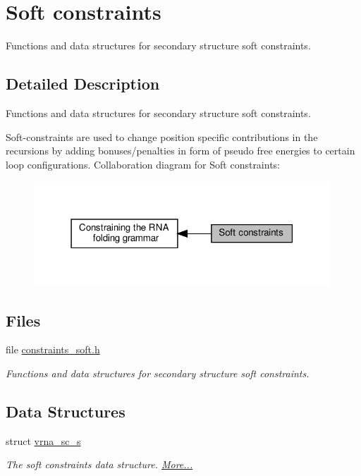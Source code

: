 \hypertarget{group__soft__constraints}{}\section{Soft constraints}
\label{group__soft__constraints}


Functions and data structures for secondary structure soft constraints.  




\subsection{Detailed Description}
Functions and data structures for secondary structure soft constraints. 

Soft-\/constraints are used to change position specific contributions in the recursions by adding bonuses/penalties in form of pseudo free energies to certain loop configurations. Collaboration diagram for Soft constraints\+:
\nopagebreak
\begin{figure}[H]
\begin{center}
\leavevmode
\includegraphics[width=315pt]{group__soft__constraints}
\end{center}
\end{figure}
\subsection*{Files}
\begin{DoxyCompactItemize}
\item 
file \hyperlink{constraints__soft_8h}{constraints\+\_\+soft.\+h}
\begin{DoxyCompactList}\small\item\em Functions and data structures for secondary structure soft constraints. \end{DoxyCompactList}\end{DoxyCompactItemize}
\subsection*{Data Structures}
\begin{DoxyCompactItemize}
\item 
struct \hyperlink{group__soft__constraints_structvrna__sc__s}{vrna\+\_\+sc\+\_\+s}
\begin{DoxyCompactList}\small\item\em The soft constraints data structure.  \hyperlink{group__soft__constraints_structvrna__sc__s}{More...}\end{DoxyCompactList}\end{DoxyCompactItemize}
